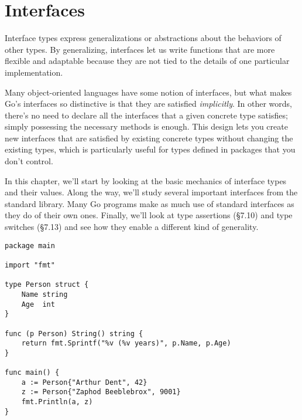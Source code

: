 \chapter{Interfaces}

Interface types express generalizations or abstractions about the behaviors of other types. By
generalizing, interfaces let us write functions that are more flexible and adaptable because they
are not tied to the details of one particular implementation.

Many object-oriented languages have some notion of interfaces, but what makes Go’s interfaces
so distinctive is that they are satisfied \textit{implicitly}. In other words, there’s no need to
declare all the interfaces that a given concrete type satisfies; simply possessing the necessary
methods is enough. This design lets you create new interfaces that are satisfied by existing
concrete types without changing the existing types, which is particularly useful for types
defined in packages that you don’t control.

In this chapter, we’ll start by looking at the basic mechanics of interface types and their values.
Along the way, we’ll study several important interfaces from the standard library. Many Go
programs make as much use of standard interfaces as they do of their own ones. Finally, we’ll
look at type assertions (§7.10) and type switches (§7.13) and see how they enable a different
kind of generality.

\begin{verbatim}
package main

import "fmt"

type Person struct {
	Name string
	Age  int
}

func (p Person) String() string {
	return fmt.Sprintf("%v (%v years)", p.Name, p.Age)
}

func main() {
	a := Person{"Arthur Dent", 42}
	z := Person{"Zaphod Beeblebrox", 9001}
	fmt.Println(a, z)
}
\end{verbatim}